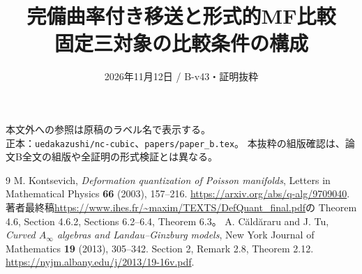 \documentclass[a4paper,11pt]{ltjsarticle}
\title{完備曲率付き移送と形式的MF比較\\\large 固定三対象の比較条件の構成}
\author{}\date{2026年11月12日 / B-v43・証明抜粋}
\theoremstyle{remark}\newtheorem{remark}[theorem]{注意}
\numberwithin{equation}{section}
\begin{document}
\maketitle
\noindent 本文外への参照は原稿のラベル名で表示する。\\
正本：\texttt{uedakazushi/nc-cubic}、\texttt{papers/paper\_b.tex}。
本抜粋の組版確認は、論文B全文の組版や全証明の形式検証とは異なる。

\begin{thebibliography}{9}
M. Kontsevich, \emph{Deformation quantization of Poisson manifolds},
Letters in Mathematical Physics \textbf{66} (2003), 157--216.
\url{https://arxiv.org/abs/q-alg/9709040}.
著者最終稿\url{https://www.ihes.fr/~maxim/TEXTS/DefQuant_final.pdf}の
Theorem 4.6, Section 4.6.2, Sections 6.2--6.4, Theorem 6.3。
A. C\u{a}ld\u{a}raru and J. Tu, \emph{Curved $A_\infty$ algebras and Landau--Ginzburg models},
New York Journal of Mathematics \textbf{19} (2013), 305--342.
Section 2, Remark 2.8, Theorem 2.12.
\url{https://nyjm.albany.edu/j/2013/19-16v.pdf}.
\end{thebibliography}
\end{document}
